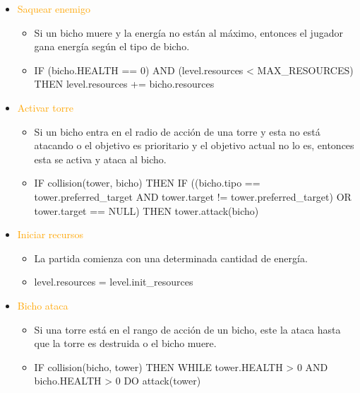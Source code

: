 \documentclass{article}
\begin{document}
\begin{itemize}
\begin{itemize}
    \end{itemize}
    \clearpage
    \item \textcolor{Orange}{Saquear enemigo}
    \begin{itemize}
        \item Si un bicho muere y la energía no están al máximo, entonces el jugador gana energía según el tipo de bicho.
        \item IF (bicho.HEALTH == 0) AND (level.resources < MAX\_RESOURCES) THEN \break level.resources += bicho.resources
    \end{itemize}
    \item \textcolor{Orange}{Activar torre}
    \begin{itemize}
        \item Si un bicho entra en el radio de acción de una torre y esta no está atacando o el objetivo es prioritario y el objetivo actual no lo es, entonces esta se activa y ataca al bicho.
        \item IF collision(tower, bicho) THEN IF ((bicho.tipo == tower.preferred\_target AND \break tower.target != tower.preferred\_target) OR tower.target == NULL) THEN \break tower.attack(bicho)
    \end{itemize}
    \item \textcolor{Orange}{Iniciar recursos}
    \begin{itemize}
        \item La partida comienza con una determinada cantidad de energía.
        \item level.resources = level.init\_resources
    \end{itemize}
    \item \textcolor{Orange}{Bicho ataca}
    \begin{itemize}
        \item Si una torre está en el rango de acción de un bicho, este la ataca hasta que la torre es destruida o el bicho muere.
        \item IF collision(bicho, tower) THEN WHILE tower.HEALTH > 0 AND bicho.HEALTH > 0 \break DO attack(tower)

    \end{itemize}
\end{itemize}

\end{document}
